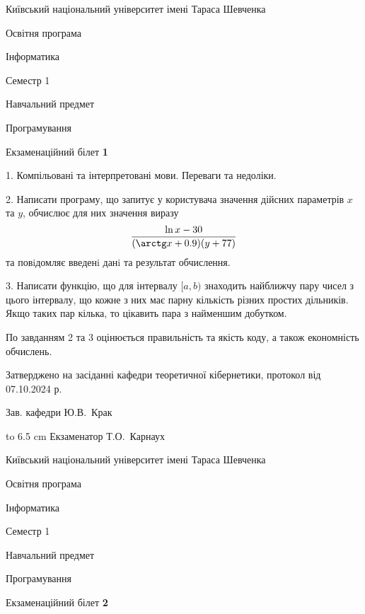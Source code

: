 \documentclass[12pt, ukrainian]{article}
\begin{document}
{{\begin {scriptsize}\par
{ \center  Київський національний університет імені Тараса Шевченка \par}
{\parbox {5 cm}{Освітня програма \hfill}{\parbox {7 cm}{Інформатика\hfill}}\parbox {6 cm}{\hfill Семестр 1}}\par
{\parbox {5 cm} {Навчальний предмет \hfill}\parbox {7 cm}{Програмування \hfill}\parbox {6cm}{\hfill}\par}\vspace{-15pt} \end{scriptsize}}{\center Екзаменаційний білет \No \textbf { 1 }\par}}
{%
1. Компільовані та інтерпретовані мови. Переваги та недоліки.%
\par
2. Написати програму, що запитує у користувача значення дійсних параметрів $x$ та $y$, обчислює для них значення виразу 
$$\frac{\ln x - 30}{(\arctg x + 0.9) (y + 77)}$$ 
та повiдомляє введенi данi та результат обчислення.

\par
3. Написати функцію, що для інтервалу $[a, b)$ знаходить найближчу пару чисел з цього інтервалу, що кожне з них має парну кількість різних простих дільників. Якщо таких пар кілька, то цікавить пара з найменшим добутком.

По завданням 2 та 3 оцінюється правильність та якість коду, а також економність обчислень.

}
{\smallskip\smallskip \begin {scriptsize} Затверджено на засіданні кафедри теоретичної кібернетики, протокол   від   07.10.2024 р.\par\smallskip\smallskip\smallskip\smallskip
{\parbox {6.5 cm} {Зав. кафедри \dotfill Ю.В.~Крак}}\hspace {0.7cm} {\hbox to 6.5 cm { Екзаменатор \dotfill Т.О.~Карнаух}} \end{scriptsize}}
\vspace{0.9cm}
{{\begin {scriptsize}\par
{ \center  Київський національний університет імені Тараса Шевченка \par}
{\parbox {5 cm}{Освітня програма \hfill}{\parbox {7 cm}{Інформатика\hfill}}\parbox {6 cm}{\hfill Семестр 1}}\par
{\parbox {5 cm} {Навчальний предмет \hfill}\parbox {7 cm}{Програмування \hfill}\parbox {6cm}{\hfill}\par}\vspace{-15pt} \end{scriptsize}}{\center Екзаменаційний білет \No \textbf { 2 }\par}}
\end{document}

